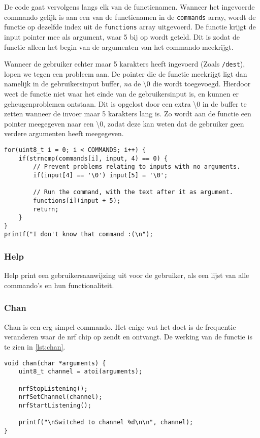 De code gaat vervolgens langs elk van de functienamen. Wanneer het ingevoerde commando gelijk is aan een van de functienamen in de \texttt{commands} array, wordt de functie op dezelfde index uit de \texttt{functions} array uitgevoerd. De functie krijgt de input pointer mee als argument, waar 5 bij op wordt geteld. Dit is zodat de functie alleen het begin van de argumenten van het commando meekrijgt.

Wanneer de gebruiker echter maar 5 karakters heeft ingevoerd (Zoals \texttt{/dest}), lopen we tegen een probleem aan. De pointer die de functie meekrijgt ligt dan namelijk in de gebruikersinput buffer, \textit{na} de \textbackslash0 die wordt toegevoegd. Hierdoor weet de functie niet waar het einde van de gebruikersinput is, en kunnen er geheugenproblemen ontstaan. Dit is opgelost door een extra \textbackslash0 in de buffer te zetten wanneer de invoer maar 5 karakters lang is. Zo wordt aan de functie een pointer meegegeven naar een \textbackslash0, zodat deze kan weten dat de gebruiker geen verdere argumenten heeft meegegeven.

\begin{lstlisting}[caption={De code die het ingevoerde commando als functie uitvoert},captionpos=b,label={lst:interpretInputRun},style=c,xleftmargin=.\textwidth,xrightmargin=.\textwidth]
for(uint8_t i = 0; i < COMMANDS; i++) {
    if(strncmp(commands[i], input, 4) == 0) {
        // Prevent problems relating to inputs with no arguments.
        if(input[4] == '\0') input[5] = '\0';

        // Run the command, with the text after it as argument.
        functions[i](input + 5);
        return;
    }
}
printf("I don't know that command :(\n");
\end{lstlisting}



\subsubsection{Help}
Help print een gebruikersaanwijzing uit voor de gebruiker, als een lijst van alle commando's en hun functionaliteit.

\subsubsection{Chan}
Chan is een erg simpel commando. Het enige wat het doet is de frequentie veranderen waar de nrf chip op zendt en ontvangt. De werking van de functie is te zien in \autoref{lst:chan}.
\begin{lstlisting}[caption={De chan functie},captionpos=b,label={lst:chan},style=c,xleftmargin=.\textwidth,xrightmargin=.\textwidth]
void chan(char *arguments) {
    uint8_t channel = atoi(arguments);

    nrfStopListening();
    nrfSetChannel(channel);
    nrfStartListening();

    printf("\nSwitched to channel %d\n\n", channel);
}
\end{lstlisting}

